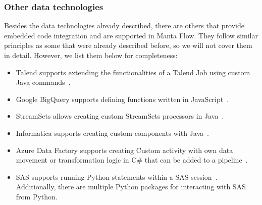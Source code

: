 \subsubsection{Other data technologies}
Besides the data technologies already described, there are others that provide embedded code integration and are supported in Manta Flow. They follow similar principles as some that were already described before, so we will not cover them in detail. However, we list them below for completeness:
\begin{itemize}
    \item Talend supports extending the functionalities of a Talend Job using custom Java commands~\cite{talend}.
    \item Google BigQuery supports defining functions written in JavaScript~\cite{bigquery}.
    \item StreamSets allows creating custom StreamSets processors in Java~\cite{streamsets}.
    \item Informatica supports creating custom components with Java~\cite{informatica}.
    \item Azure Data Factory supports creating Custom activity with own data movement or transformation logic in C\# that can be added to a pipeline~\cite{adf}.
    \item SAS supports running Python statements within a SAS session~\cite{sas}. Additionally, there are multiple Python packages for interacting with SAS from Python.
\end{itemize}

